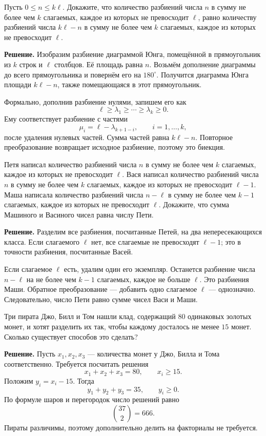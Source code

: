 \begin{problems}
\item Пусть $0\le n\le k\ell$. Докажите, что количество разбиений числа $n$ в сумму не более чем $k$ слагаемых, каждое из которых не превосходит $\ell$, равно количеству разбиений числа $k\ell-n$ в сумму не более чем $k$ слагаемых, каждое из которых не превосходит $\ell$.
\par\smallskip\noindent\textbf{Решение.} Изобразим разбиение диаграммой Юнга, помещённой в прямоугольник из $k$ строк и $\ell$ столбцов. Её площадь равна $n$. Возьмём дополнение диаграммы до всего прямоугольника и повернём его на $180^\circ$. Получится диаграмма Юнга площади $k\ell-n$, также помещающаяся в этот прямоугольник.
\par Формально, дополнив разбиение нулями, запишем его как
\[
\ell\ge\lambda_1\ge\cdots\ge\lambda_k\ge0.
\]
Ему соответствует разбиение с частями
\[
\mu_i=\ell-\lambda_{k+1-i},\qquad i=1,\ldots,k,
\]
после удаления нулевых частей. Сумма частей равна $k\ell-n$. Повторное преобразование возвращает исходное разбиение, поэтому это биекция.\par

\item Петя написал количество разбиений числа $n$ в сумму не более чем $k$ слагаемых, каждое из которых не превосходит $\ell$. Вася написал количество разбиений числа $n$ в сумму не более чем $k$ слагаемых, каждое из которых не превосходит $\ell-1$. Маша написала количество разбиений числа $n-\ell$ в сумму не более чем $k-1$ слагаемых, каждое из которых не превосходит $\ell$. Докажите, что сумма Машиного и Васиного чисел равна числу Пети.
\par\smallskip\noindent\textbf{Решение.} Разделим все разбиения, посчитанные Петей, на два непересекающихся класса. Если слагаемого $\ell$ нет, все слагаемые не превосходят $\ell-1$; это в точности разбиения, посчитанные Васей.
\par Если слагаемое $\ell$ есть, удалим один его экземпляр. Останется разбиение числа $n-\ell$ на не более чем $k-1$ слагаемых, каждое не больше $\ell$. Это разбиения Маши. Обратное преобразование --- добавить одно слагаемое $\ell$ --- однозначно. Следовательно, число Пети равно сумме чисел Васи и Маши.\par

\item Три пирата Джо, Билл и Том нашли клад, содержащий $80$ одинаковых золотых монет, и хотят разделить их так, чтобы каждому досталось не менее $15$ монет. Сколько существует способов это сделать?
\par\smallskip\noindent\textbf{Решение.} Пусть $x_1,x_2,x_3$ --- количества монет у Джо, Билла и Тома соответственно. Требуется посчитать решения
\[
x_1+x_2+x_3=80,\qquad x_i\ge15.
\]
Положим $y_i=x_i-15$. Тогда
\[
y_1+y_2+y_3=35,\qquad y_i\ge0.
\]
По формуле шаров и перегородок число решений равно
\[
\binom{37}{2}=666.
\]
Пираты различимы, поэтому дополнительно делить на факториалы не требуется.\par


\end{problems}
